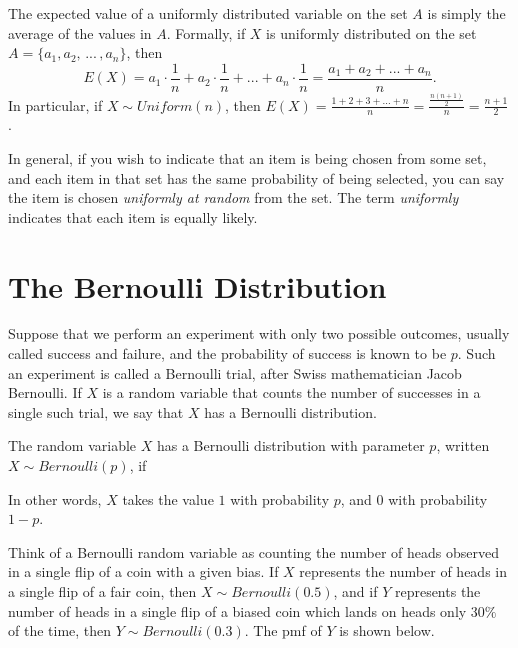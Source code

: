 The expected value of a uniformly distributed variable on the set $A$ is simply the average of the values in $A$. Formally, if $X$ is uniformly distributed on the set $A = \{a_1, a_2,\, ... \, , a_n\}$, then
$$E(X) = a_1 \cdot \textstyle\frac{1}{n} + a_2 \cdot \frac{1}{n} + ... + a_n \cdot \frac{1}{n} = \frac{a_1 + a_2 + ... + a_n}{n}.$$
In particular, if $X \sim Uniform(n)$, then $E(X) = \frac{1+2+3+...+n}{n} = \frac{\frac{n(n+1)}{2}}{n} = \frac{n+1}{2}$.
\par
\rmk In general, if you wish to indicate that an item is being chosen from some set, and each item in that set has the same probability of being selected, you can say the item is chosen \emph{uniformly at random} from the set. The term \emph{uniformly} indicates that each item is equally likely.

\section{The Bernoulli Distribution}\label{BernoulliDist}

Suppose that we perform an experiment with only two possible outcomes, usually called success and failure, and the probability of success is known to be $p$. Such an experiment is called a Bernoulli trial, after Swiss mathematician Jacob Bernoulli. If $X$ is a random variable that counts the number of successes in a single such trial, we say that $X$ has a Bernoulli distribution.

\begin{defn}The random variable $X$ has a Bernoulli distribution with parameter $p$, written $X \sim Bernoulli(p)$, if
\renewcommand*{\arraystretch}{1.35}
\renewcommand*{\arraystretch}{1}
\par
\noindent In other words, $X$ takes the value $1$ with probability $p$, and $0$ with probability $1-p$.
\end{defn}

Think of a Bernoulli random variable as counting the number of heads observed in a single flip of a coin with a given bias. If $X$ represents the number of heads in a single flip of a fair coin, then $X \sim Bernoulli(0.5)$, and if $Y$ represents the number of heads in a single flip of a biased coin which lands on heads only $30\%$ of the time, then $Y \sim Bernoulli(0.3)$. The pmf of $Y$ is shown below.

